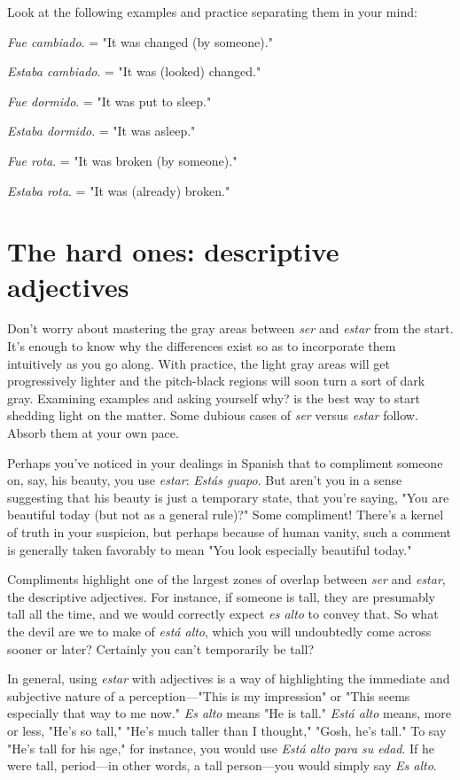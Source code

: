 \documentclass[14pt,a4paper,oneside]{memoir}
\newcommand{\bsk}{\vspace{20pt}}
\newcommand{\indu}{\hspace{20pt}}
\begin{document}
Look at the following examples and practice separating them
in your mind:

\bsk

\indu \emph{Fue cambiado}. = "It was changed (by someone)."

\indu \emph{Estaba cambiado}. = "It was (looked) changed."

\indu \emph{Fue dormido}. = "It was put to sleep."

\indu \emph{Estaba dormido}. = "It was asleep."

\indu \emph{Fue rota}. = "It was broken (by someone)."

\indu \emph{Estaba rota}. = "It was (already) broken."

\section{The hard ones: descriptive adjectives}

Don't worry about mastering the gray areas between \emph{ser} and
\emph{estar} from the start. It's enough to know why the differences exist so
as to incorporate them intuitively as you go along. With practice, the
light gray areas will get progressively lighter and the pitch-black regions will soon turn a sort of dark gray. Examining examples and asking yourself why? is the best way to start shedding light on the matter.
Some dubious cases of \emph{ser} versus \emph{estar} follow. Absorb them at your
own pace.

Perhaps you've noticed in your dealings in Spanish that to compliment someone on, say, his beauty, you use \emph{estar}: \emph{Estás guapo}. But
aren't you in a sense suggesting that his beauty is just a temporary
state, that you're saying, "You are beautiful today (but not as a general
rule)?" Some compliment! There's a kernel of truth in your suspicion,
but perhaps because of human vanity, such a comment is generally
taken favorably to mean "You look especially beautiful today."

Compliments highlight one of the largest zones of overlap between \emph{ser} and \emph{estar}, the descriptive adjectives. For instance, if someone is tall, they are presumably tall all the time, and we would correctly expect \emph{es alto} to convey that. So what the devil are we to make
of \emph{está alto}, which you will undoubtedly come across sooner or later?
Certainly you can't temporarily be tall?

In general, using \emph{estar} with adjectives is a way of highlighting
the immediate and subjective nature of a perception---"This is my
impression" or "This seems especially that way to me now." \emph{Es alto}
means "He is tall." \emph{Está alto} means, more or less, "He's so tall," "He's
much taller than I thought," "Gosh, he's tall." To say "He's tall for his
age," for instance, you would use \emph{Está alto para su edad}. If he were
tall, period---in other words, a tall person---you would simply say
\emph{Es alto}.
\end{document}
